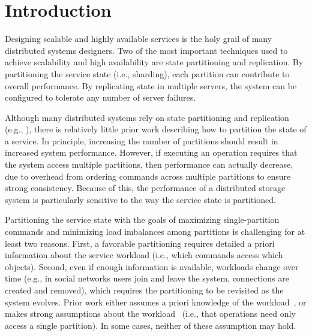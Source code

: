 \section{Introduction}

Designing scalable and highly available services is the holy grail of
many distributed systems designers.  Two of the most important
techniques used to achieve scalability and high availability are state
partitioning and replication.  By partitioning the service state
(i.e., sharding), each partition can contribute to overall
performance. By replicating state in multiple servers, the
system can be configured to tolerate any number of server failures.


Although many distributed systems rely on state partitioning and
replication (e.g., \cite{x,y,z,w}), there is relatively little prior
work describing how to partition the state of a service.  In
principle, increasing the number of partitions should result in
increased system performance. However, if executing an operation
requires that the system access multiple partitions, then performance
can actually decrease, due to overhead from ordering commands across
multiple partitions to ensure strong consistency. Because of this, 
the performance of a distributed storage system is particularly
sensitive to the way the service state is partitioned.




Partitioning the service state with the goals of maximizing
single-partition commands and minimizing load imbalances among
partitions is challenging for at least two reasons.  First, a
favorable partitioning requires detailed a priori information about
the service workload (i.e., which commands access which objects).
Second, even if enough information is available, workloads change over
time (e.g., in social networks users join and leave the system,
connections are created and removed), which requires the partitioning
to be revisited as the system evolves.  Prior work either assumes a
priori knowledge of the workload~\cite{curino2010sch}, or makes strong
assumptions about the workload~\cite{long16} (i.e., that operations
need only access a single partition). In some cases, neither of these
assumption may hold.


